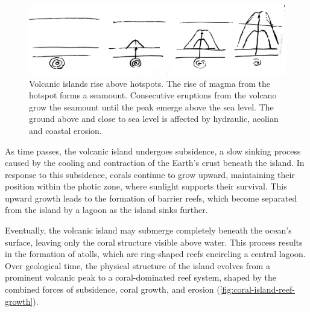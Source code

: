 \begin{figure}[t]
    \centering
    \includegraphics[width = \linewidth]{other_images/Drawings/Volcano.jpg}
    \caption{Volcanic islands rise above hotspots. The rise of magma from the hotspot forms a seamount. Consecutive eruptions from the volcano grow the seamount until the peak emerge above the sea level. The ground above and close to sea level is affected by hydraulic, aeolian and coastal erosion.}
    \label{fig:coral-island-island-growth}
\end{figure}

As time passes, the volcanic island undergoes subsidence, a slow sinking process caused by the cooling and contraction of the Earth's crust beneath the island. In response to this subsidence, corals continue to grow upward, maintaining their position within the photic zone, where sunlight supports their survival. This upward growth leads to the formation of barrier reefs, which become separated from the island by a lagoon as the island sinks further.

Eventually, the volcanic island may submerge completely beneath the ocean's surface, leaving only the coral structure visible above water. This process results in the formation of atolls, which are ring-shaped reefs encircling a central lagoon. Over geological time, the physical structure of the island evolves from a prominent volcanic peak to a coral-dominated reef system, shaped by the combined forces of subsidence, coral growth, and erosion (\cref{fig:coral-island-reef-growth}).

